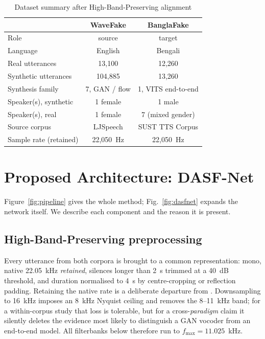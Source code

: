 \documentclass[conference]{IEEEtran}
\renewcommand{\cite}[1]{\unskip}
\begin{document}
\begin{table}[htbp]
\caption{Dataset summary after High-Band-Preserving alignment}
\label{tab:datasets}
\centering
\begin{tabular}{lcc}
\toprule
& \textbf{WaveFake} & \textbf{BanglaFake} \\
\midrule
Role & source & target \\
Language & English & Bengali \\
Real utterances & 13,100 & 12,260 \\
Synthetic utterances & 104,885 & 13,260 \\
Synthesis family & 7, GAN / flow & 1, VITS end-to-end \\
Speaker(s), synthetic & 1 female & 1 male \\
Speaker(s), real & 1 female & 7 (mixed gender) \\
Source corpus & LJSpeech & SUST TTS Corpus \\
Sample rate (retained) & 22,050~Hz & 22,050~Hz \\
\bottomrule
\end{tabular}
\end{table}

\section{Proposed Architecture: DASF-Net}
\label{sec:arch}

Figure~\ref{fig:pipeline} gives the whole method; Fig.~\ref{fig:dasfnet}
expands the network itself. We describe each component and the reason it is
present.

\subsection{High-Band-Preserving preprocessing}
\label{sec:hbp}
Every utterance from both corpora is brought to a common representation:
mono, native 22.05~kHz \emph{retained}, silences longer than 2~s trimmed at
a 40~dB threshold, and duration normalised to 4~s by centre-cropping or
reflection padding. Retaining the native rate is a deliberate departure
from \cite{ahmed2026melspec}. Downsampling to 16~kHz imposes an 8~kHz
Nyquist ceiling and removes the 8--11~kHz band; for a within-corpus study
that loss is tolerable, but for a cross-\emph{paradigm} claim it silently
deletes the evidence most likely to distinguish a GAN vocoder from an
end-to-end model. All filterbanks below therefore run to
$f_{\max} = 11.025$~kHz.
\end{document}
